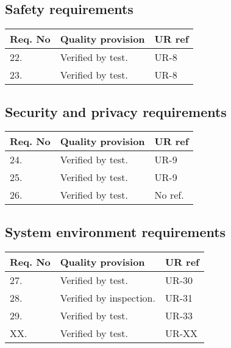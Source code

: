 \subsection{Safety requirements}
\begin{center}
    \begin{tabular}{ | l | p{9cm} | l |}
    \hline
    Req. No & Quality provision  									& UR ref \\ \hline
    	22. & Verified by test.  								& UR-8 \\ \hline
    	23. & Verified by test.  								& UR-8 \\ \hline  		
    \end{tabular}
\end{center}



\subsection{Security and privacy requirements}
\begin{center}
    \begin{tabular}{ | l | p{9cm} | l |}
    \hline
    Req. No & Quality provision  									& UR ref \\ \hline
		24. & Verified by test.  								& UR-9 \\ \hline
		25. & Verified by test.  								& UR-9 \\ \hline
		26. & Verified by test.  								& No ref. \\ \hline
    \end{tabular}
\end{center}

\subsection{System environment requirements}
\begin{center}
   	\begin{tabular}{ | l | p{9cm} | l |}
    \hline
    Req. No & Quality provision  & UR ref \\ \hline
	27. & Verified by test.  								& UR-30 \\ \hline
	28. & Verified by inspection.  								& UR-31 \\ \hline
	29. & Verified by test.  								& UR-33 \\ \hline
	XX. & Verified by test.  								& UR-XX \\ \hline %
    \end{tabular}
\end{center}

